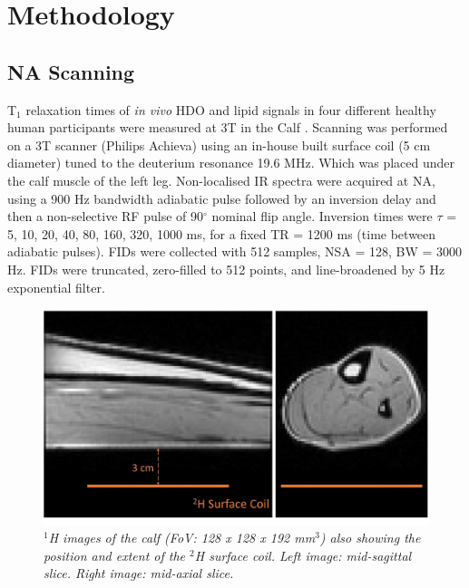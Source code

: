 \section{Methodology}

\subsection{\ac{NA} Scanning}

T$_1$ relaxation times of \textit{in vivo} \ac{HDO} and lipid signals in four different healthy human participants were measured at 3T in the Calf \cite{Damion2021NaturalT}. Scanning was performed on a 3T scanner (Philips Achieva) using an in-house built surface coil (5 cm diameter) tuned to the deuterium resonance 19.6 MHz. Which was placed under the calf muscle of the left leg. Non-localised \ac{IR} spectra were acquired at \ac{NA}, using a 900 Hz bandwidth adiabatic pulse followed by an inversion delay and then a non-selective \ac{RF} pulse of 90$^\circ$ nominal flip angle. Inversion times were $\tau$ = {5, 10, 20, 40, 80, 160, 320, 1000} ms, for a fixed \ac{TR} = 1200 ms (time between adiabatic pulses). \ac{FID}s were collected with 512 samples, NSA = 128, \ac{BW} = 3000 Hz. FIDs were truncated, zero-filled to 512 points, and line-broadened by 5 Hz exponential filter. %

\begin{figure}
    \centering
    \includegraphics[width=1\textwidth]{Figures/Lipid/Coil.jpg}
    \caption{\textit{$^1$H images of the calf (FoV: 128 x 128 x 192 mm$^3$) also showing the position and extent of the $^2$H surface coil. Left image: mid-sagittal slice. Right image: mid-axial slice.}}
    \label{fig:Lip:Coil}
\end{figure}

